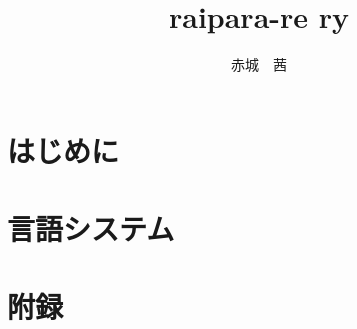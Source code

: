 \documentclass[a4paper, 12pt, titlepage]{ltjsreport}
\title{raipara-re ry}
\author{赤城　茜}
\begin{document}
\maketitle

\tableofcontents

\part{はじめに}



\part{言語システム}








\part{附録}




\end{document}
